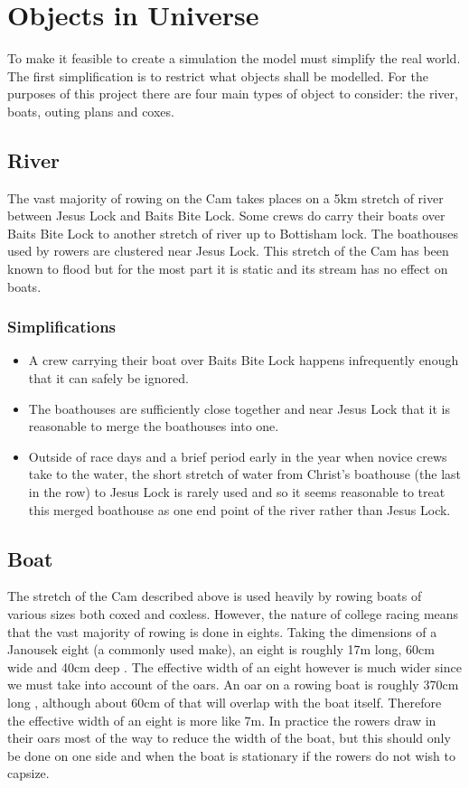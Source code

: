 \section{Objects in Universe}

To make it feasible to create a simulation the model must simplify the real world. The first simplification is to restrict what objects shall be modelled. For the purposes of this project there are four main types of object to consider: the river, boats, outing plans and coxes. 

\subsection{River}
The vast majority of rowing on the Cam takes places on a 5km stretch of river between Jesus Lock and Baits Bite Lock. Some crews do carry their boats over Baits Bite Lock to another stretch of river up to Bottisham lock. The boathouses used by rowers are clustered near Jesus Lock. This stretch of the Cam has been known to flood but for the most part it is static and its stream has no effect on boats. 

\subsubsection{Simplifications}
\begin{itemize}
  \item A crew carrying their boat over Baits Bite Lock happens infrequently enough that it can safely be ignored.
  \item The boathouses are sufficiently close together and near Jesus Lock that it is reasonable to merge the boathouses into one. 
  \item Outside of race days and a brief period early in the year when novice crews take to the water, the short stretch of water from Christ's boathouse (the last in the row) to Jesus Lock is rarely used and so it seems reasonable to treat this merged boathouse as one end point of the river rather than Jesus Lock.
\end{itemize}

\subsection{Boat}
The stretch of the Cam described above is used heavily by rowing boats of various sizes both coxed and coxless. However, the nature of college racing means that the vast majority of rowing is done in eights. Taking the dimensions of a Janousek eight (a commonly used make), an eight is roughly 17m long, 60cm wide and 40cm deep \cite{Janousek}. The effective width of an eight however is much wider since we must take into account of the oars. An oar on a rowing boat is roughly 370cm long \cite{Concept2}, although about 60cm of that will overlap with the boat itself. Therefore the effective width of an eight is more like 7m. In practice the rowers draw in their oars most of the way to reduce the width of the boat, but this should only be done on one side and when the boat is stationary if the rowers do not wish to capsize.

